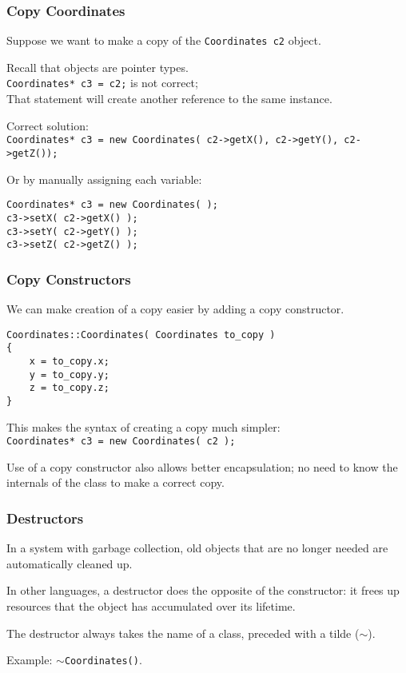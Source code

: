 \begin{frame}[fragile]
\frametitle{Copy Coordinates}
Suppose we want to make a copy of the \texttt{Coordinates c2} object.

Recall that objects are pointer types. \\
\quad \texttt{Coordinates* c3 = c2;} is not correct; \\
\quad That statement will create another reference to the same instance.

Correct solution:\\
\quad \texttt{Coordinates* c3 = new Coordinates( c2->getX(), c2->getY(), c2->getZ());}


Or by manually assigning each variable:
\begin{verbatim}
Coordinates* c3 = new Coordinates( );
c3->setX( c2->getX() );
c3->setY( c2->getY() );
c3->setZ( c2->getZ() );
\end{verbatim}

\end{frame}

\begin{frame}[fragile]
\frametitle{Copy Constructors}
We can make creation of a copy easier by adding a \alert{copy constructor}.

\begin{verbatim}
Coordinates::Coordinates( Coordinates to_copy )
{
    x = to_copy.x;
    y = to_copy.y;
    z = to_copy.z;
}
\end{verbatim}

This makes the syntax of creating a copy much simpler:\\
\quad \texttt{Coordinates* c3 = new Coordinates( c2 );}

Use of a copy constructor also allows better encapsulation; no need to know the internals of the class to make a correct copy.

\end{frame}

\begin{frame}
\frametitle{Destructors}


In a system with garbage collection, old objects that are no longer needed are automatically cleaned up.

In other languages, a destructor does the opposite of the constructor: it frees up resources that the object has accumulated over its lifetime.

The destructor always takes the name of a class, preceded with a tilde (\texttt{$\sim$}).

Example: \texttt{$\sim$Coordinates()}.

\end{frame}



